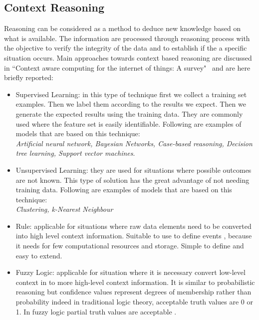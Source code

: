 \documentclass{thesisreport}
\begin{document}
 \subsection{Context Reasoning}
 
 Reasoning can be considered as a method to deduce new knowledge based on what is available.  
 The information are processed through reasoning process with the objective to verify the integrity of the data and to establish if the a specific situation occurs. Main approaches towards context based reasoning are discussed in ``Context aware computing for the internet of things:  A survey"~\cite{perera2014context} and are here briefly reported:
 
 \begin{itemize}
     \item Supervised Learning: in this type of technique first we collect a training set examples. Then we label them according to the results we expect. Then we generate the expected results using the training data.
     They are commonly used where the feature set is easily identifiable. Following are examples of models that are based on this technique:\\ \textit{Artificial neural network, Bayesian Networks, Case-based reasoning, Decision tree learning, Support vector machines}.
     
     \item Unsupervised Learning: they are used for situations where possible outcomes are not known. This type of solution has the great advantage of not needing training data. Following are examples of models that are based on this technique:\\ \textit{Clustering, k-Nearest Neighbour}
     
     \item Rule: applicable for situations where raw data elements need to be converted into high level context information. Suitable to use to define events , because it needs for few computational resources and storage. Simple to define and easy to extend.
     
     \item Fuzzy Logic: applicable for situation where it is necessary convert low-level context in to more high-level context information. It is similar to probabilistic reasoning but confidence values represent degrees of membership rather than probability indeed in traditional logic theory, acceptable truth values are 0 or 1. In fuzzy logic partial truth values are acceptable \cite{perera2014context}.
     

\end{itemize}
\end{document}
